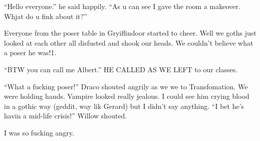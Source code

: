 \enquote{Hello everyone.} he said happily. \enquote{As u can see I gave the room a makeover. Whjat do u fink about it?}

Everyone from the poser table in Gryiffindoor started to cheer. Well we goths just looked at each other all disfusted and shook our heads. We couldn't believe what a poser he was!1.

\enquote{BTW you can call me Albert.} HE CALLED AS WE LEFT to our classes.

\enquote{What a fucking poser!} Draco shouted angrily as we we to Transfomation. We were holding hands. Vampire looked really jealous. I could see him crying blood in a gothic way (geddit, way lik Gerard) but I didn't say anything. \enquote{I bet he's havin a mid-life crisis!} Willow shouted.

I was so fucking angry.

